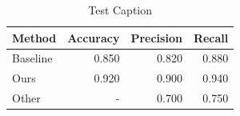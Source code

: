 \begin{table}[htbp]
\centering
\caption{Test Caption}
\label{tab:label1}
\begin{tabular}{lrrr}
\toprule
Method & Accuracy & Precision & Recall \\
\midrule
Baseline & 0.850 & 0.820 & 0.880 \\
Ours & 0.920 & 0.900 & 0.940 \\
Other & - & 0.700 & 0.750 \\
\bottomrule
\end{tabular}
\end{table}
